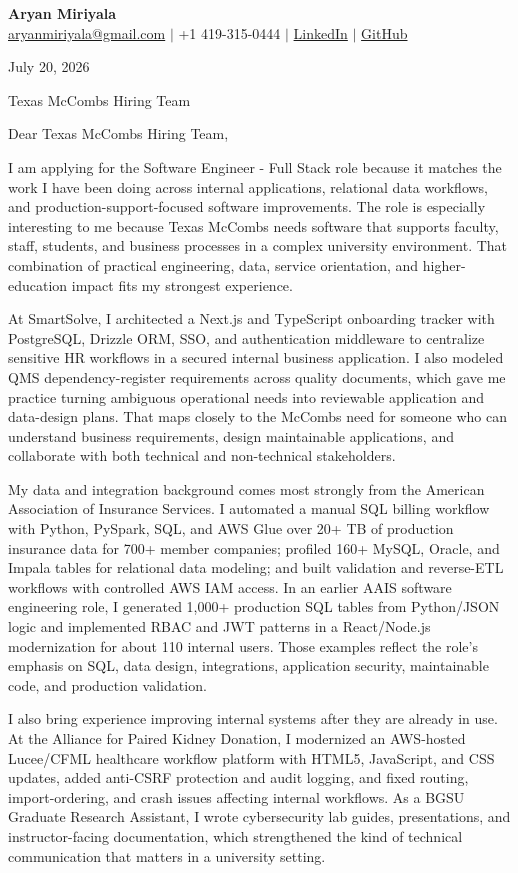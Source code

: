 \documentclass[letterpaper,11pt]{article}
\begin{document}
{\Large\textbf{Aryan Miriyala}}\\
\href{mailto:aryanmiriyala@gmail.com}{aryanmiriyala@gmail.com} $|$ +1 419-315-0444 $|$
\href{https://www.linkedin.com/in/aryan-miriyala-7788a21b6/}{LinkedIn} $|$
\href{https://github.com/aryanmiriyala}{GitHub}

July 20, 2026

Texas McCombs Hiring Team

Dear Texas McCombs Hiring Team,

I am applying for the Software Engineer - Full Stack role because it matches the work I have been doing across internal applications, relational data workflows, and production-support-focused software improvements. The role is especially interesting to me because Texas McCombs needs software that supports faculty, staff, students, and business processes in a complex university environment. That combination of practical engineering, data, service orientation, and higher-education impact fits my strongest experience.

At SmartSolve, I architected a Next.js and TypeScript onboarding tracker with PostgreSQL, Drizzle ORM, SSO, and authentication middleware to centralize sensitive HR workflows in a secured internal business application. I also modeled QMS dependency-register requirements across quality documents, which gave me practice turning ambiguous operational needs into reviewable application and data-design plans. That maps closely to the McCombs need for someone who can understand business requirements, design maintainable applications, and collaborate with both technical and non-technical stakeholders.

My data and integration background comes most strongly from the American Association of Insurance Services. I automated a manual SQL billing workflow with Python, PySpark, SQL, and AWS Glue over 20+ TB of production insurance data for 700+ member companies; profiled 160+ MySQL, Oracle, and Impala tables for relational data modeling; and built validation and reverse-ETL workflows with controlled AWS IAM access. In an earlier AAIS software engineering role, I generated 1,000+ production SQL tables from Python/JSON logic and implemented RBAC and JWT patterns in a React/Node.js modernization for about 110 internal users. Those examples reflect the role's emphasis on SQL, data design, integrations, application security, maintainable code, and production validation.

I also bring experience improving internal systems after they are already in use. At the Alliance for Paired Kidney Donation, I modernized an AWS-hosted Lucee/CFML healthcare workflow platform with HTML5, JavaScript, and CSS updates, added anti-CSRF protection and audit logging, and fixed routing, import-ordering, and crash issues affecting internal workflows. As a BGSU Graduate Research Assistant, I wrote cybersecurity lab guides, presentations, and instructor-facing documentation, which strengthened the kind of technical communication that matters in a university setting.
\end{document}
